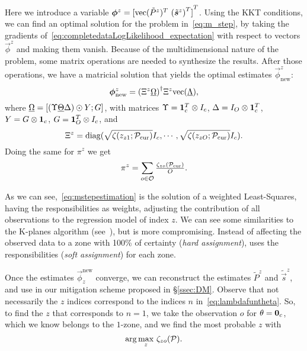 \documentclass{ifacconf}  %
\begin{document}
Here we introduce a variable ${\vec{\phi}^{z}={[\vectorize{\tilde{P}^{z}}^{T}\ {(\tilde{\vec{s}}^{z})}^{T} ]}^{T}}$.
Using the KKT conditions, we can find an optimal solution for the problem in~\eqref{eq:m_step}, by
taking the gradients of~\eqref{eq:completedataLogLikelihood_expectation} with respect to vectors $\vec{\phi}^{z}$ and making them vanish.
Because of the multidimensional nature of the problem, some matrix operations are needed to synthesize the results.
After those operations, we have a matricial solution that yields the optimal estimates $\vec{\phi}^{z}_{\mathrm{new}}$:
\begin{equation}
  \label{eq:mstepestimation}
  \boldsymbol{\phi}^{z}_{\mathrm{new}}={(\Xi^{z}\underline{\Omega})}^{\dagger}\Xi^{z}\mathrm{vec} (\underline{\Lambda}),
\end{equation}
where
${\underline{\Omega}=[(\Upsilon \underline{\Theta}\Delta)\odot Y;G]}$,
with matrices
${\Upsilon=\mathbf{1}_{c}^{T}\mathbin{\otimes}I_{c}}$,
${\Delta=I_{O}\mathbin{\otimes}\mathbf{1}_{c}^{T}}$,
${Y=G\mathbin{\otimes}\mathbf{1}_{c}}$,
${G=\mathbf{1}_{O}^{T}\mathbin{\otimes}I_{c}}$,
and
\[{\Xi^{z}={\operatorname{diag}(\sqrt{{\zeta(z_{z1};\mathcal{P}_{\mathrm{cur}})}}I_{c},\cdots,\sqrt{{\zeta(z_{zO};\mathcal{P}_{\mathrm{cur}})}}I_{c})}}.\]
Doing the same for $\pi^{z}$ we get
\begin{equation}
  \label{eq:3}
  \pi^{z}=\sum\limits_{o\in\mathcal{O}}\tfrac{\zeta_{zo}(\mathcal{P}_{\mathrm{cur}})}{O}.
\end{equation}

As we can see,~\eqref{eq:mstepestimation} is the solution of a weighted Least-Squares, having the responsibilities as weights, adjusting the contribution of all observations to the regression model of index $z$.
We can see some similarities to the K-planes algorithm (see~\cite{BradleyMangasarian2000}), but \EM{} is more compromising.
Instead of affecting the observed data to a zone with 100\% of certainty (\emph{hard assignment}), \EM{} uses the responsibilities (\emph{soft assignment}) for each zone.

Once the estimates $\vec{\phi}_{z}^{\mathrm{new}}$ converge, we can reconstruct the estimates $\tilde{P}^{z}$ and $\tilde{\vec{s}}^{z}$, and use in our mitigation scheme proposed in \S\ref{ssec:DM}.
Observe that not necessarily the $z$ indices correspond to the indices $n$ in~\eqref{eq:lambdafuntheta}.
So, to find the $z$ that corresponds to ${n=1}$, we take the observation $o$ for $\relax{\theta}=\mathbf{0}_{c}$, which we know belongs to the $1$-zone, and we find the most probable $z$ with
\begin{equation}\label{eq:argmaxz}
\arg\underset{z}{\max}\ {\zeta_{zo}(\mathcal{P})}.
\end{equation}
\end{document}
